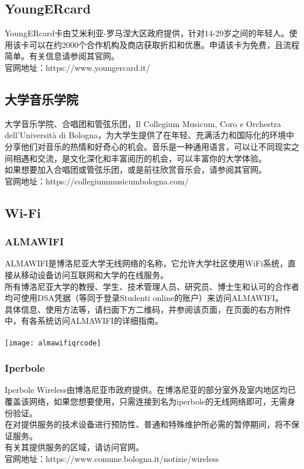 \subsection{YoungERcard}
YoungERcard卡由艾米利亚-罗马涅大区政府提供，针对14-29岁之间的年轻人。使用该卡可以在约2000个合作机构及商店获取折扣和优惠。申请该卡为免费，且流程简单。有关信息请参阅其官网。\\
官网地址：https://www.youngercard.it/

\subsection{大学音乐学院}
大学音乐学院、合唱团和管弦乐团，Il Collegium Musicum, Coro e Orchestra dell’Università di Bologna，为大学生提供了在年轻、充满活力和国际化的环境中分享他们对音乐的热情和好奇心的机会。音乐是一种通用语言，可以让不同现实之间相遇和交流，是文化深化和丰富阅历的机会，可以丰富你的大学体验。\\
如果想要加入合唱团或管弦乐团，或是前往欣赏音乐会，请参阅其官网。\\
官网地址：https://collegiummusicumbologna.com/

\subsection{Wi-Fi}
\subsubsection{ALMAWIFI}
ALMAWIFI是博洛尼亚大学无线网络的名称，它允许大学社区使用WiFi系统，直接从移动设备访问互联网和大学的在线服务。\\
所有博洛尼亚大学的教授、学生、技术管理人员、研究员、博士生和认可的合作者均可使用DSA凭据（等同于登录Studenti online的账户）来访问ALMAWIFI。\\
具体信息、使用方法等，请扫面下方二维码，并参阅该页面，在页面的右方附件中，有各系统访问ALMAWIFI的详细指南。\\
\\
\texttt{[image: almawifiqrcode]}
\subsubsection{Iperbole}
Iperbole Wireless由博洛尼亚市政府提供。在博洛尼亚的部分室外及室内地区均已覆盖该网络，如果您想要使用，只需连接到名为iperbole的无线网络即可，无需身份验证。\\
在对提供服务的技术设备进行预防性、普通和特殊维护所必需的暂停期间，将不保证服务。\\
有关其提供服务的区域，请访问官网。\\
官网地址：https://www.comune.bologna.it/notizie/wireless


